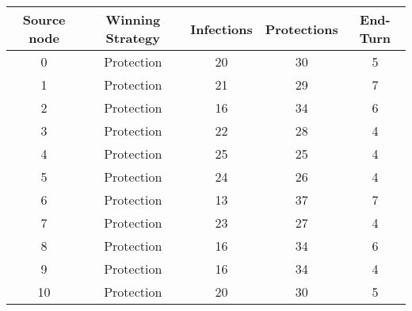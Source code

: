 \documentclass[results.tex]{subfiles}
\begin{document}
    \begin{center}
        \begin{tabular}{| c || c | c | c | c |}
            \hline
            {\bfseries Source node} & {\bfseries Winning Strategy} & {\bfseries Infections} & {\bfseries Protections}
            & {\bfseries End-Turn}
            \\  %
            \hline\hline
            0                       & Protection                   & 20                     & 30                      & 5                    \\
            \hline
            1                       & Protection                   & 21                     & 29                      & 7                    \\
            \hline
            2                       & Protection                   & 16                     & 34                      & 6                    \\
            \hline
            3                       & Protection                   & 22                     & 28                      & 4                    \\
            \hline
            4                       & Protection                   & 25                     & 25                      & 4                    \\
            \hline
            5                       & Protection                   & 24                     & 26                      & 4                    \\
            \hline
            6                       & Protection                   & 13                     & 37                      & 7                    \\
            \hline
            7                       & Protection                   & 23                     & 27                      & 4                    \\
            \hline
            8                       & Protection                   & 16                     & 34                      & 6                    \\
            \hline
            9                       & Protection                   & 16                     & 34                      & 4                    \\
            \hline
            10                      & Protection                   & 20                     & 30                      & 5                    \\

\end{tabular}
\end{center}
\end{document}
